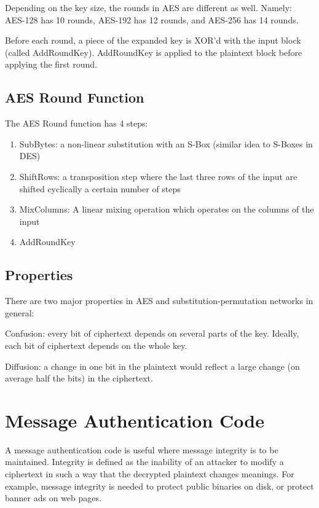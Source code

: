 \documentclass{article}
\begin{document}
\begin{multicols}{2}
Depending on the key size, the rounds in AES are different as well. Namely: AES-128 has 10 rounds, AES-192 has 12 rounds, and AES-256 has 14 rounds. 

Before each round, a piece of the expanded key is XOR'd with the input block (called AddRoundKey). AddRoundKey is applied to the plaintext block before applying the first round. 

\subsection{AES Round Function}

The AES Round function has 4 steps:

\begin{enumerate}
    \item SubBytes: a non-linear substitution with an S-Box (similar idea to S-Boxes in DES)
    \item ShiftRows: a transposition step where the last three rows of the input are shifted cyclically a certain number of steps
    \item MixColumns: A linear mixing operation which operates on the columns of the input
    \item AddRoundKey 
\end{enumerate}

\subsection{Properties}

There are two major properties in AES and substitution-permutation networks in general:

Confusion: every bit of ciphertext depends on several parts of the key. Ideally, each bit of ciphertext depends on the whole key.

Diffusion: a change in one bit in the plaintext would reflect a large change (on average half the bits) in the ciphertext.

\section{Message Authentication Code}

A message authentication code is useful where message integrity is to be maintained. Integrity is defined as the inability of an attacker to modify a ciphertext in such a way that the decrypted plaintext changes meanings. For example, message integrity is needed to protect public binaries on disk, or protect banner ads on web pages.


\end{multicols}
\end{document}
